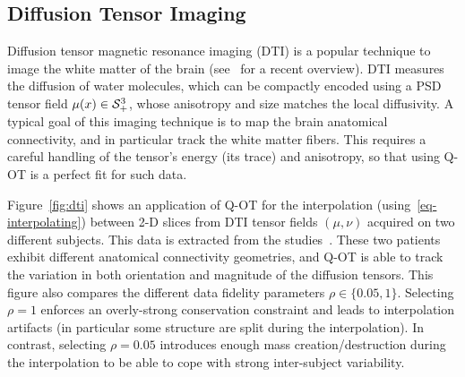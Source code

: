 



\subsection{Diffusion Tensor Imaging}

Diffusion tensor magnetic resonance imaging (DTI) is a popular technique to image the white matter of the brain (see~\cite{wandell2016clarifying} for a recent overview). DTI measures the diffusion of water molecules, which can be compactly encoded using a PSD tensor field $\mu(x) \in \mathcal{S}_+^3$, whose anisotropy and size matches the local diffusivity. 
%
A typical goal of this imaging technique is to map the brain anatomical connectivity, and in particular track the  white matter fibers. This requires a careful handling of the tensor's energy (its trace) and anisotropy, so that using Q-OT is a perfect fit for such data.

Figure~\ref{fig:dti} shows an application of Q-OT for the interpolation (using~\ref{eq-interpolating}) between 2-D slices from DTI tensor fields $(\mu,\nu)$ acquired on two different subjects. This data is extracted from the studies~\cite{pestilli2014evaluation,takemura2016ensemble}. These two patients exhibit different anatomical connectivity geometries, and Q-OT is able to track the variation in both orientation and magnitude of the diffusion tensors. This figure also compares the different data fidelity parameters $\rho \in \{0.05,1\}$. Selecting $\rho=1$ enforces an overly-strong conservation constraint and leads to interpolation artifacts (in particular some structure are split during the interpolation). In contrast, selecting $\rho=0.05$ introduces enough mass creation/destruction during the interpolation to be able to cope with strong inter-subject variability.

\newcommand{\DTIimg}[1]{\texttt{[image: dti/\#1]}}

